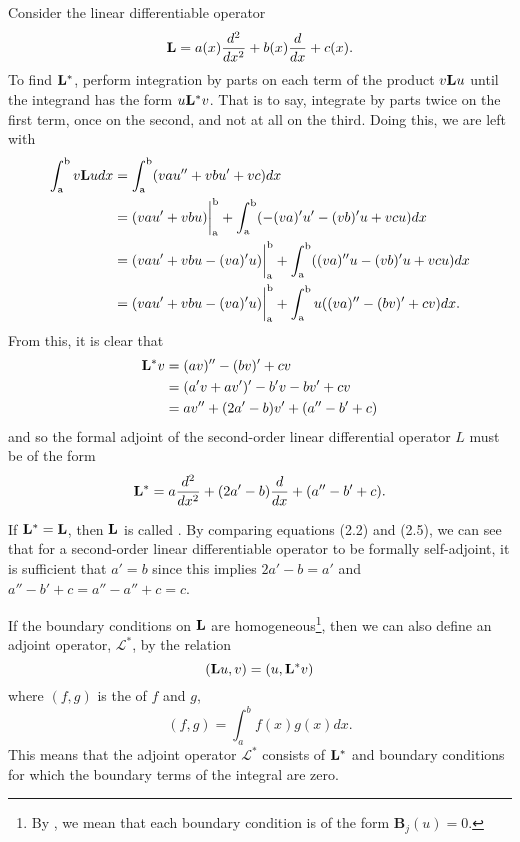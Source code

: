 \begin{example}
	Consider the linear differentiable operator
	\begin{equation}
		\mathrm{\bf{L}}= a(x) \frac{d^2}{dx^2} + b(x)\frac{d}{dx} + c(x).
	\end{equation}
	To find \(\mathrm{\bf{L^*}}  \), perform integration by parts on each term of the product \(v\mathrm{\bf{L}} u\) until the integrand has the form \(u \mathrm{\bf{L}}^* v\). That is to say, integrate by parts twice on the first term, once on the second, and not at all on the third. Doing this, we are left with
	\begin{equation}
		\begin{split}
			\int_\mathrm{a}^\mathrm{b} v\mathrm{\bf{L}} u dx &= \int_\mathrm{a}^\mathrm{b} (vau''+ vbu' + vc)dx\\
			&=(vau'+vbu)\biggr\rvert_\mathrm{a}^\mathrm{b} + \int_\mathrm{a}^\mathrm{b} (-(va)'u'-(vb)'u+vcu)dx\\
			&=(vau'+vbu-(va)'u)\biggr\rvert_\mathrm{a}^\mathrm{b} + \int_\mathrm{a}^\mathrm{b} ((va)''u-(vb)'u+vcu)dx\\
			&=(vau'+vbu-(va)'u)\biggr\rvert_\mathrm{a}^\mathrm{b} + \int_\mathrm{a}^\mathrm{b} u((va)''-(bv)'+cv)dx.
		\end{split}
	\end{equation}
	From this, it is clear that 
	\begin{equation}
		\begin{split}
			\mathrm{\bf{L^*}} v &= (av)''-(bv)'+cv\\
			     &= (a'v+av')'-b'v-bv'+cv\\
			     &= av''+(2a'-b)v'+(a''-b'+c)
		\end{split}
	\end{equation}
	and so the formal adjoint of the second-order linear differential operator \(L\) must be of the form
	\begin{equation}
		\mathrm{\bf{L^*}} =a\frac{d^2}{dx^2} + (2a'-b)\frac{d}{dx}+(a''-b'+c).
	\end{equation}
	
	
	If \(\mathrm{\bf{L^*}}  = \mathrm{\bf{L}}\), then \( \mathrm{\bf{L}}\) is called . By comparing equations (2.2) and (2.5), we can see that for a second-order linear differentiable operator to be formally self-adjoint, it is sufficient that \(a'=b\) since this implies \(2a'-b=a'\) and \(a''-b'+c=a''-a''+c=c\).
\end{example}

\begin{definition}
	If the boundary conditions on \(\mathrm{\bf{L}}\) are homogeneous\footnote{By , we mean that each boundary condition is of the form \(\mathbf{B}_j (u)=0\).}, then we can also define an adjoint operator, \(\mathcal{L}^*\), by the relation
	\begin{equation}
		(\mathrm{\bf{L}} u,v) = (u,\mathrm{\bf{L^*}} v)
	\end{equation}
	where \((f,g)\) is the  of \(f\) and \(g\),
	\begin{equation}
		(f,g) = \int_a^bf(x)g(x)dx.
	\end{equation}
	This means that the adjoint operator \(\mathcal{L}^*\) consists of \(\mathrm{\bf{L^*}} \) and boundary conditions for which the boundary terms of the integral are zero. 
\end{definition}


